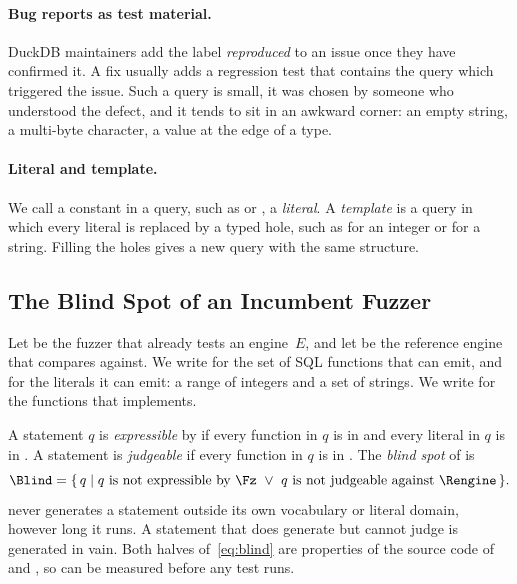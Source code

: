 \paragraph{Bug reports as test material.} DuckDB maintainers add the label
\emph{reproduced} to an issue once they have confirmed it. A fix usually adds a
regression test that contains the query which triggered the issue. Such a query
is small, it was chosen by someone who understood the defect, and it tends to sit
in an awkward corner: an empty string, a multi-byte character, a value at the
edge of a type.

\paragraph{Literal and template.} We call a constant in a query, such as
 or , a \emph{literal}. A \emph{template} is a query in which
every literal is replaced by a typed hole, such as  for an integer or
 for a string. Filling the holes gives a new query with the same
structure.

\subsection{The Blind Spot of an Incumbent Fuzzer}
\label{sec:problem}

Let \Fz be the fuzzer that already tests an engine~$E$, and let \Rengine be the
reference engine that \Fz compares against. We write \Voc for the set of SQL
functions that \Fz can emit, and \Lit for the literals it can emit: a range of
integers and a set of strings. We write \VocR for the functions that \Rengine
implements.

A statement $q$ is \emph{expressible} by \Fz if every function in $q$ is in \Voc
and every literal in $q$ is in \Lit. A statement is \emph{judgeable} if every
function in $q$ is in \VocR. The \emph{blind spot} of \Fz is
\begin{equation}
  \label{eq:blind}
  \Blind = \{\, q \mid q \text{ is not expressible by } \Fz
           \ \lor\ q \text{ is not judgeable against } \Rengine \,\}.
\end{equation}
\Fz never generates a statement outside its own vocabulary or literal domain,
however long it runs. A statement that \Fz does generate but cannot judge is
generated in vain. Both halves of~\eqref{eq:blind} are properties of the source
code of \Fz and \Rengine, so \Blind can be measured before any test runs.


